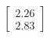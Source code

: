 \documentclass[preview]{standalone}
\begin{document}
\begin{align*}
\begin{bmatrix} 2.26 \\ 2.83 \end{bmatrix}
\end{align*}
\end{document}
